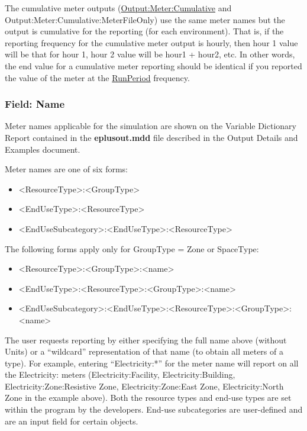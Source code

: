 The cumulative meter outputs (\hyperref[outputmetercumulative-and-outputmetercumulativemeterfileonly]{Output:Meter:Cumulative} and Output:\-Meter:\-Cumulative:\-Meter\-File\-Only) use the same meter names but the output is cumulative for the reporting (for each environment). That is, if the reporting frequency for the cumulative meter output is hourly, then hour 1 value will be that for hour 1, hour 2 value will be hour1 + hour2, etc. In other words, the end value for a cumulative meter reporting should be identical if you reported the value of the meter at the \hyperref[runperiod]{RunPeriod} frequency.

\subsubsection{Field: Name}\label{field-name-1-036}

Meter names applicable for the simulation are shown on the Variable Dictionary Report contained in the \textbf{eplusout.mdd} file described in the Output Details and Examples document.

Meter names are one of six forms:

\begin{itemize}
\item
  \textless{}ResourceType\textgreater{}:\textless{}GroupType\textgreater{}
\item
  \textless{}EndUseType\textgreater{}:\textless{}ResourceType\textgreater{}
\item
  \textless{}EndUseSubcategory\textgreater{}:\textless{}EndUseType\textgreater{}:\textless{}ResourceType\textgreater{}
\end{itemize}
The following forms apply only for GroupType = Zone or SpaceType:
\begin{itemize}
\item
  \textless{}ResourceType\textgreater{}:\textless{}GroupType\textgreater{}:\textless{}name\textgreater{}
\item
  \textless{}EndUseType\textgreater{}:\textless{}ResourceType\textgreater{}:\textless{}GroupType\textgreater{}:\textless{}name\textgreater{}
\item
  \textless{}EndUseSubcategory\textgreater{}:\textless{}EndUseType\textgreater{}:\textless{}ResourceType\textgreater{}:\textless{}GroupType\textgreater{}:\textless{}name\textgreater{}
\end{itemize}

The user requests reporting by either specifying the full name above (without Units) or a ``wildcard'' representation of that name (to obtain all meters of a type). For example, entering ``Electricity:*'' for the meter name will report on all the Electricity: meters (Electricity:Facility, Electricity:Building, Electricity:Zone:Resistive Zone, Electricity:Zone:East Zone, Electricity:North Zone in the example above). Both the resource types and end-use types are set within the program by the developers. End-use subcategories are user-defined and are an input field for certain objects.


